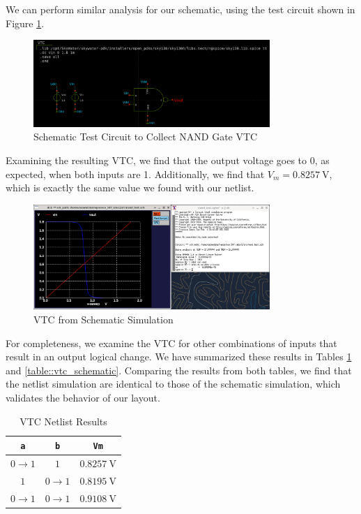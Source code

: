 \documentclass{article}
\begin{document}
	\noindent We can perform similar analysis for our schematic, using the test circuit shown in Figure \ref{fig::nand_vtc_schem_test_circuit}.
	
	\begin{figure}[H]
		\centerline{\includegraphics[width=0.8\textwidth]{nand_vtc_test_circuit.png}}
		\caption{Schematic Test Circuit to Collect NAND Gate VTC}
		\label{fig::nand_vtc_schem_test_circuit}
	\end{figure}
	
	\noindent Examining the resulting VTC, we find that the output voltage goes to 0, as expected, when both inputs are 1. Additionally, we find that $V_m = 0.8257\ \text{V}$, which is exactly the same value we found with our netlist.
	
	\begin{figure}[H]
		\centerline{\includegraphics[width=0.8\textwidth]{nand_vtc_schem.png}}
		\caption{VTC from Schematic Simulation}
		\label{fig::nand_vtc_schem}
	\end{figure}	
	
	For completeness, we examine the VTC for other combinations of inputs that result in an output logical change. We have summarized these results in Tables \ref{table::vtc_netlist} and \ref{table::vtc_schematic}. Comparing the results from both tables, we find that the netlist simulation are identical to those of the schematic simulation, which validates the behavior of our layout. 
	
	\begin{table}[H]
	\begin{center}
	\caption{VTC Netlist Results}
	\label{table::vtc_netlist}
	\begin{tabular}{| c | c | c |}
		\hline
		\texttt{a} & \texttt{b} & \texttt{Vm}\\
		\hline	
		$0 \rightarrow 1$ & $1$ & $0.8257\ \text{V}$\\
		\hline	
		$1$ & $0 \rightarrow 1$ & $0.8195\ \text{V}$\\
		\hline	
		$0 \rightarrow 1$ & $0 \rightarrow 1$ & $0.9108\ \text{V}$\\
		\hline
	\end{tabular}
	\end{center}
	\end{table}
	
\end{document}
